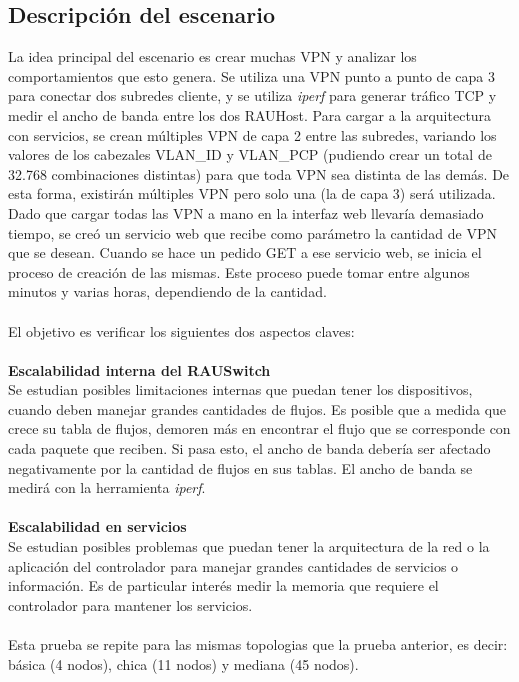 \subsection{Descripción del escenario}
La idea principal del escenario es crear muchas VPN y analizar los comportamientos que esto genera. Se utiliza una VPN punto a punto de capa 3 para conectar dos subredes cliente, y se utiliza \textit{iperf} para generar tráfico TCP y medir el ancho de banda entre los dos RAUHost. Para cargar a la arquitectura con servicios, se crean múltiples VPN de capa 2 entre las subredes, variando los valores de los cabezales VLAN\_ID y VLAN\_PCP (pudiendo crear un total de 32.768 combinaciones distintas) para que toda VPN sea distinta de las demás. De esta forma, existirán múltiples VPN pero solo una (la de capa 3) será utilizada. \\
Dado que cargar todas las VPN a mano en la interfaz web llevaría demasiado tiempo, se creó un servicio web que recibe como parámetro la cantidad de VPN que se desean. Cuando se hace un pedido GET a ese servicio web, se inicia el proceso de creación de las mismas. Este proceso puede tomar entre algunos minutos y varias horas, dependiendo de la cantidad. \\ \\
El objetivo es verificar los siguientes dos aspectos claves: \\ \\
\textbf{Escalabilidad interna del RAUSwitch} \\
Se estudian posibles limitaciones internas que puedan tener los dispositivos, cuando deben manejar grandes cantidades de flujos. Es posible que a medida que crece su tabla de flujos, demoren más en encontrar el flujo que se corresponde con cada paquete que reciben. Si pasa esto, el ancho de banda debería ser afectado negativamente por la cantidad de flujos en sus tablas. El ancho de banda se medirá con la herramienta \textit{iperf}.  \\ \\
\textbf{Escalabilidad en servicios} \\
Se estudian posibles problemas que puedan tener la arquitectura de la red o la aplicación del controlador para manejar grandes cantidades de servicios o información. Es de particular interés medir la memoria que requiere el controlador para mantener los servicios. \\ \\
Esta prueba se repite para las mismas topologias que la prueba anterior, es decir: básica (4 nodos), chica (11 nodos) y mediana (45 nodos).

